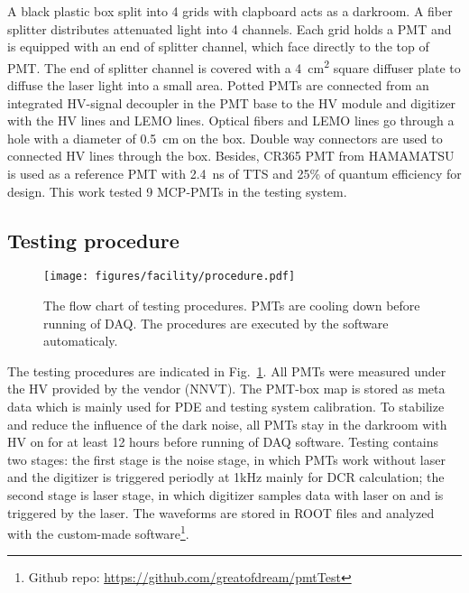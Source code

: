 A black plastic box split into 4 grids with clapboard acts as a darkroom. A fiber splitter %
distributes attenuated light into 4 channels. Each grid holds a PMT and is equipped with an end of splitter channel, which face directly to the top of PMT. The end of splitter channel is covered with a \SI{4}{cm\tothe{2}} square diffuser plate to diffuse the laser light into a small area. Potted PMTs are connected from an integrated HV-signal decoupler in the PMT base to the HV module and digitizer with the HV lines and LEMO lines. Optical fibers and LEMO lines go through a hole with a diameter of \SI{0.5}{cm} on the box. Double way connectors are used to connected HV lines through the box. Besides, CR365 PMT \cite{BJBS} from HAMAMATSU is used as a reference PMT with \SI{2.4}{ns} of TTS and 25\% of quantum efficiency for design. %
This work tested 9 MCP-PMTs in the testing system.

\subsection{Testing procedure}
\begin{figure}
    \centering
    \texttt{[image: figures/facility/procedure.pdf]}
    \caption{The flow chart of testing procedures. PMTs are cooling down before running of DAQ. The procedures are executed by the software automaticaly.}
    \label{fig:testingprocedure}
\end{figure}

The testing procedures are indicated in Fig.~\ref{fig:testingprocedure}. All PMTs were measured under the HV provided by the vendor (NNVT). %
The PMT-box map is stored as meta data which is mainly used for PDE and testing system calibration. To stabilize and reduce the influence of the dark noise, all PMTs stay in the darkroom with HV on for at least 12 hours before running of DAQ software. Testing contains two stages: the first stage is the noise stage, in which PMTs work without laser and the digitizer is triggered periodly at 1kHz mainly for DCR calculation; the second stage is laser stage, in which digitizer samples data with laser on and is triggered by the laser. The waveforms are stored in ROOT files and analyzed with the custom-made software\footnote{Github repo: \url{https://github.com/greatofdream/pmtTest}}.